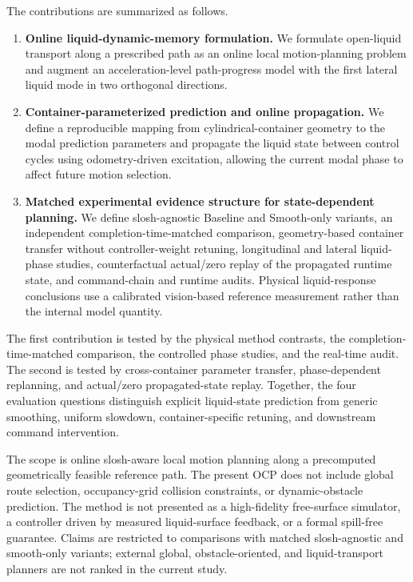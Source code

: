 The contributions are summarized as follows.
\begin{enumerate}
  \item \textbf{Online liquid-dynamic-memory \MPCC{} formulation.}
  We formulate open-liquid transport along a prescribed path as an online local motion-planning problem and augment an acceleration-level path-progress \MPCC{} model with the first lateral liquid mode in two orthogonal directions.
  \item \textbf{Container-parameterized prediction and online propagation.}
  We define a reproducible mapping from cylindrical-container geometry to the modal prediction parameters and propagate the liquid state between control cycles using odometry-driven excitation, allowing the current modal phase to affect future motion selection.
  \item \textbf{Matched experimental evidence structure for state-dependent planning.}
  We define slosh-agnostic Baseline and Smooth-only \MPCC{} variants, an independent completion-time-matched comparison, geometry-based container transfer without controller-weight retuning, longitudinal and lateral liquid-phase studies, counterfactual actual/zero replay of the propagated runtime state, and command-chain and runtime audits. Physical liquid-response conclusions use a calibrated vision-based reference measurement rather than the internal model quantity.
\end{enumerate}

The first contribution is tested by the physical method contrasts, the completion-time-matched comparison, the controlled phase studies, and the real-time audit. The second is tested by cross-container parameter transfer, phase-dependent replanning, and actual/zero propagated-state replay. Together, the four evaluation questions distinguish explicit liquid-state prediction from generic smoothing, uniform slowdown, container-specific retuning, and downstream command intervention.

The scope is online slosh-aware local motion planning along a precomputed geometrically feasible reference path. The present OCP does not include global route selection, occupancy-grid collision constraints, or dynamic-obstacle prediction. The method is not presented as a high-fidelity free-surface simulator, a controller driven by measured liquid-surface feedback, or a formal spill-free guarantee. Claims are restricted to comparisons with matched slosh-agnostic and smooth-only \MPCC{} variants; external global, obstacle-oriented, and liquid-transport planners are not ranked in the current study.
